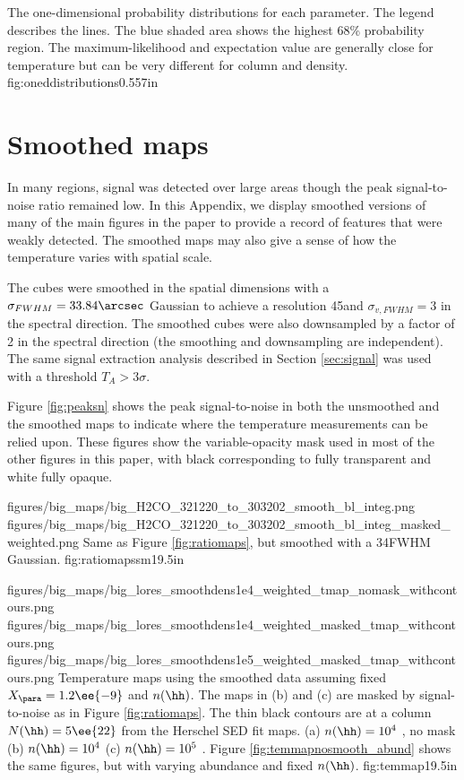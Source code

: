 {The one-dimensional probability distributions for each parameter.  The legend
describes the lines.  The blue shaded area shows the highest 68\% probability
region.  The maximum-likelihood and expectation value are generally
close for temperature but can be very different for column and density.}
{fig:oneddistributions}{0.55}{7in}

\section{Smoothed maps}
\label{appendix:smoothed}
In many regions, signal was detected over large areas though the peak
signal-to-noise ratio remained low.  In this Appendix, we display smoothed
versions of many of the main figures in the paper to provide a record of
features that were weakly detected.  The smoothed maps may also give a sense
of how the temperature varies with spatial scale.

The cubes were smoothed in the spatial dimensions with a
$\sigma_{FWHM}=33.84\arcsec$ Gaussian to achieve a resolution 45\arcsec and
$\sigma_{v, FWHM} = 3$ \kms in the spectral direction.  The smoothed cubes were
also downsampled by a factor of 2 in the spectral direction (the smoothing and
downsampling are independent).  
The same signal extraction analysis described in Section \ref{sec:signal} was used with a
threshold $T_A > 3\sigma$.  

Figure \ref{fig:peaksn} shows the peak signal-to-noise in both the unsmoothed
and the smoothed maps to indicate where the temperature measurements can be
relied upon.  These figures show the variable-opacity mask used in most of the
other figures in this paper, with black corresponding to fully transparent and
white fully opaque.


\RotFigureTwoAA
{figures/big_maps/big_H2CO_321220_to_303202_smooth_bl_integ.png}
{figures/big_maps/big_H2CO_321220_to_303202_smooth_bl_integ_masked_weighted.png}
{Same as Figure \ref{fig:ratiomaps}, but smoothed with a 34\arcsec FWHM Gaussian.
}
{fig:ratiomapssm}{1}{9.5in}


\RotFigureThreeAA
{figures/big_maps/big_lores_smoothdens1e4_weighted_tmap_nomask_withcontours.png}
{figures/big_maps/big_lores_smoothdens1e4_weighted_masked_tmap_withcontours.png}
{figures/big_maps/big_lores_smoothdens1e5_weighted_masked_tmap_withcontours.png}
{Temperature maps using the smoothed data assuming fixed $X_{\para}=1.2\ee{-9}$
and $n(\hh)$.  The maps in (b) and (c) are masked by signal-to-noise as in
Figure \ref{fig:ratiomaps}.  The thin black contours are at a column
$N(\hh)=5\ee{22}$ \persc from the Herschel SED fit maps.
(a) $n(\hh) = 10^4$ \percc, no mask
(b) $n(\hh) = 10^4$ \percc
(c) $n(\hh) = 10^5$ \percc.
Figure \ref{fig:temmapnosmooth_abund} shows the same figures, but with varying
abundance and fixed $n(\hh)$.
}
{fig:temmap}{1}{9.5in}



